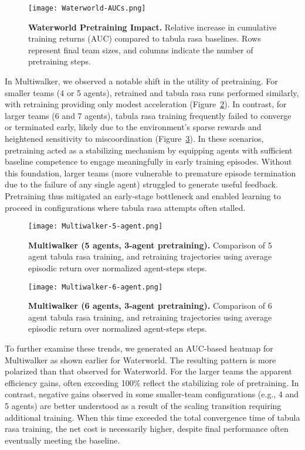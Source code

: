 \begin{figure}[ht]
    \centering
    \texttt{[image: Waterworld-AUCs.png]}
    \caption{\textbf{Waterworld Pretraining Impact.} 
    Relative increase in cumulative training returns (AUC) compared to tabula rasa baselines. 
    Rows represent final team sizes, and columns indicate the number of pretraining steps.}
    \label{fig:waterworld-aucs}
\end{figure}

In Multiwalker, we observed a notable shift in the utility of pretraining. 
For smaller teams (4 or 5 agents), retrained and tabula rasa runs performed similarly, 
with retraining providing only modest acceleration (Figure~\ref{fig:multiwalker-5}). 
In contrast, for larger teams (6 and 7 agents), tabula rasa training frequently failed to 
converge or terminated early, likely due to the environment's sparse rewards and heightened 
sensitivity to miscoordination (Figure~\ref{fig:multiwalker-6}). 
In these scenarios, pretraining acted as a stabilizing mechanism by equipping agents 
with sufficient baseline competence to engage meaningfully in early training episodes. 
Without this foundation, larger teams (more vulnerable to premature episode termination 
due to the failure of any single agent) struggled to generate useful feedback. 
Pretraining thus mitigated an early-stage bottleneck and enabled learning to proceed 
in configurations where tabula rasa attempts often stalled.

\begin{figure}[!ht]
    \centering
    \texttt{[image: Multiwalker-5-agent.png]}
    \caption{\textbf{Multiwalker (5 agents, 3-agent pretraining).} Comparison of 
    5 agent tabula rasa training, and retraining trajectories using average 
    episodic return over normalized agent-steps steps.}
    \label{fig:multiwalker-5}
\end{figure}

\vspace{2em}

\begin{figure}[!ht]
    \centering
    \texttt{[image: Multiwalker-6-agent.png]}
    \caption{\textbf{Multiwalker (6 agents, 3-agent pretraining).} Comparison of 
    6 agent tabula rasa training, and retraining trajectories using average 
    episodic return over normalized agent-steps steps.}
    \label{fig:multiwalker-6}
\end{figure}

To further examine these trends, we generated an AUC-based heatmap for Multiwalker as shown 
earlier for Waterworld. The resulting pattern is more polarized than that observed for Waterworld.
For the larger teams the apparent efficiency gains, often exceeding 100\%
reflect the stabilizing role of pretraining.
In contrast, negative gains observed in some smaller-team configurations (e.g., 4 and 5 agents) 
are better understood as a result of the scaling transition requiring additional training. 
When this time exceeded the total convergence time of tabula rasa training, the net cost 
is necessarily higher, despite final performance often eventually meeting the baseline.

